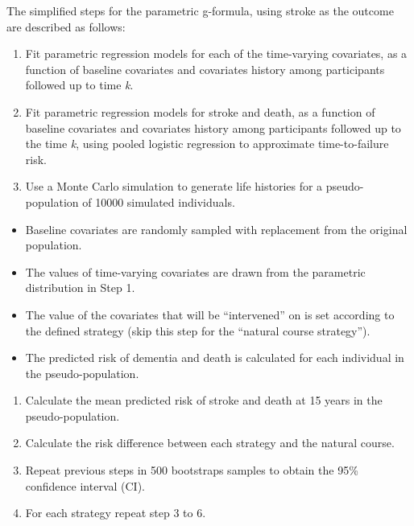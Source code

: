 \documentclass[
]{book}
\begin{document}
The simplified steps for the parametric g-formula, using stroke as the outcome are described as follows:

\begin{enumerate}
\def\labelenumi{\arabic{enumi}.}
\item
  Fit parametric regression models for each of the time-varying covariates, as a function of baseline covariates and covariates history among participants followed up to time \emph{k}.
\item
  Fit parametric regression models for stroke and death, as a function of baseline covariates and covariates history among participants followed up to the time \emph{k}, using pooled logistic regression to approximate time-to-failure risk.
\item
  Use a Monte Carlo simulation to generate life histories for a pseudo-population of 10000 simulated individuals.
\end{enumerate}

\begin{itemize}
\item
  Baseline covariates are randomly sampled with replacement from the original population.
\item
  The values of time-varying covariates are drawn from the parametric distribution in Step 1.
\item
  The value of the covariates that will be ``intervened'' on is set according to the defined strategy (skip this step for the ``natural course strategy'').
\item
  The predicted risk of dementia and death is calculated for each individual in the pseudo-population.
\end{itemize}

\begin{enumerate}
\def\labelenumi{\arabic{enumi}.}
\setcounter{enumi}{3}
\item
  Calculate the mean predicted risk of stroke and death at 15 years in the pseudo-population.
\item
  Calculate the risk difference between each strategy and the natural course.
\item
  Repeat previous steps in 500 bootstraps samples to obtain the 95\% confidence interval (CI).
\item
  For each strategy repeat step 3 to 6.
\end{enumerate}
\end{document}

